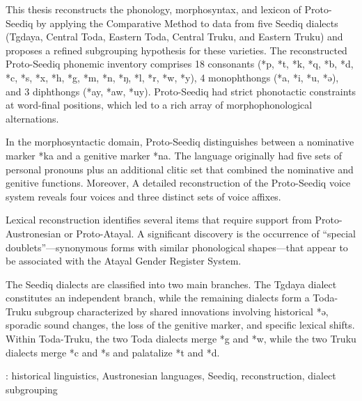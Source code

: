 \vspace{-1.25cm}
This thesis reconstructs the phonology, morphosyntax, and lexicon of Proto-Seediq by applying the Comparative Method to data from five Seediq dialects (Tgdaya, Central Toda, Eastern Toda, Central Truku, and Eastern Truku) and proposes a refined subgrouping hypothesis for these varieties. The reconstructed Proto-Seediq phonemic inventory comprises 18 consonants (*p, *t, *k, *q, *b, *d, *c, *s, *x, *h, *g, *m, *n, *ŋ, *l, *r, *w, *y), 4 monophthongs (*a, *i, *u, *ə), and 3 diphthongs (*ay, *aw, *uy). Proto-Seediq had strict phonotactic constraints at word-final positions, which led to a rich array of morphophonological alternations.

In the morphosyntactic domain, Proto-Seediq distinguishes between a nominative marker *ka and a genitive marker *na. The language originally had five sets of personal pronouns plus an additional clitic set that combined the nominative and genitive functions. Moreover, A detailed reconstruction of the Proto-Seediq voice system reveals four voices and three distinct sets of voice affixes.

Lexical reconstruction identifies several items that require support from Proto-Austronesian or Proto-Atayal. A significant discovery is the occurrence of ``special doublets''—synonymous forms with similar phonological shapes—that appear to be associated with the Atayal Gender Register System. 

The Seediq dialects are classified into two main branches. The Tgdaya dialect constitutes an independent branch, while the remaining dialects form a Toda-Truku subgroup characterized by shared innovations involving historical *ə, sporadic sound changes, the loss of the genitive marker, and specific lexical shifts. Within Toda-Truku, the two Toda dialects merge *g and *w, while the two Truku dialects merge *c and *s and palatalize *t and *d.

\noindent [Keywords]: historical linguistics, Austronesian languages, Seediq, reconstruction, dialect subgrouping





